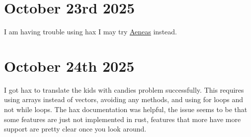 \documentclass{amsart}
\theoremstyle{definition}
\begin{document}
\section{October 23rd 2025}

I am having trouble using hax I may try \href{https://github.com/AeneasVerif/aeneas/tree/main?tab=readme-ov-file#documentation}{Aeneas} instead.

\section{October 24th 2025}

I got hax to translate the kids with candies problem successfully. This requires using arrays instead of vectors, avoiding any methods, and using for loops and not while loops. The hax documentation was helpful, the issue seems to be that some features are just not implemented in rust, features that more have more support are pretty clear once you look around.

\nocite{*}

{}
\end{document}
